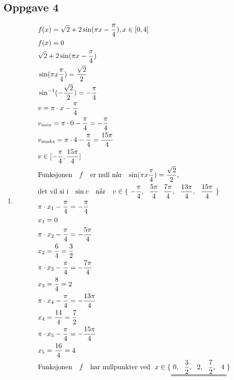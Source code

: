\documentclass[11pt,a4paper]{report}
\newcommand{\opg}[1]{\subsection*{Oppgave #1}}
\begin{document}

\newpage
\opg{4}
\begin{enumerate}[leftmargin=*,itemsep=0.75cm,labelsep=1.5em,label=\alph*)]
\item[]
\begin{align*}
&f(x) = \sqrt{2} + 2 \sin (\pi x - \frac{\pi}{4}), x \in [0, 4]\\
&f(x) = 0\\
&\sqrt{2} + 2 \sin (\pi x - \frac{\pi}{4})\\
&\sin (\pi x \frac{\pi}{4}) = \frac{\sqrt{2}}{2}\\
&\sin^{-1} (-\frac{\sqrt{2}}{2}) = -\frac{\pi}{4}\\
&v = \pi \cdot x - \frac{\pi}{4}\\
&v_{min} = \pi \cdot 0 - \frac{\pi}{4} = - \frac{\pi}{4}\\
&v_{maks} = \pi \cdot 4 - \frac{\pi}{4} = \frac{15 \pi}{4}\\
&v \in [- \frac{\pi}{4}, \frac{15 \pi}{4}]\\
&\text{Funksjonen \ \ $f$ \ \ er null når \ \ $\sin (\pi x \frac{\pi}{4}) = \frac{\sqrt{2}}{2}$,}\\
&\text{det vil si i \ \ $\sin v$ \ \ når } \ \ v \in \{ \ -\frac{\pi}{4}, \ \ \frac{5 \pi}{4} \ \ \frac{7 \pi}{4}, \ \ \frac{13 \pi}{4}, \ \ \frac{15 \pi}{4} \ \}\\
&\pi \cdot x_1 - \frac{\pi}{4} = - \frac{\pi}{4}\\
&x_1 = 0\\
&\pi \cdot x_2 - \frac{\pi}{4} = - \frac{5 \pi}{4}\\
&x_2 = \frac{6}{4} = \frac{3}{2}\\
&\pi \cdot x_3 - \frac{\pi}{4} = - \frac{7 \pi}{4}\\
&x_3 = \frac{8}{4} = 2\\
&\pi \cdot x_4 - \frac{\pi}{4} = - \frac{13 \pi}{4}\\
&x_4 = \frac{14}{4} = \frac{7}{2}\\
&\pi \cdot x_5 - \frac{\pi}{4} = - \frac{15 \pi}{4}\\
&x_5 = \frac{16}{4} = 4\\
&\text{Funksjonen \ \ $f$ \ \ har nullpunkter ved} \ \ x \in \{\uuline{ \ 0, \ \ \frac{3}{2}, \ \ 2, \ \ \frac{7}{2}, \ \ 4 \ }\}
\end{align*}
\end{enumerate}
\end{document}
